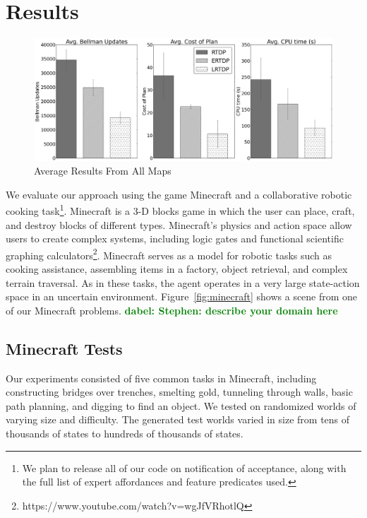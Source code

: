 \documentclass[letterpaper]{article}
\newcommand{\dnote}[1]{\textcolor{Green}{\textbf{dabel:  #1}}}
\begin{document}
\section{Results}
\label{sec:results}

\begin{figure}
\centering
\includegraphics[scale=0.18]{figures/average_results_cropped.png}%
\caption{Average Results From All Maps}
\label{fig:average_results}
\end{figure}

We evaluate our approach using the game Minecraft and a
collaborative robotic cooking task\footnote{We plan to release all of our code on notification of acceptance, along with the full list of expert affordances and feature predicates used.}.  Minecraft is a 3-D blocks game in which
the user can place, craft, and destroy blocks of different types.
Minecraft's physics and action space allow users to create complex
systems, including logic gates and functional scientific graphing
calculators\footnote{https://www.youtube.com/watch?v=wgJfVRhotlQ}.
Minecraft serves as a model for robotic tasks such as cooking
assistance, assembling items in a factory, object retrieval, and
complex terrain traversal.  As in these tasks, the agent operates in a
very large state-action space in an uncertain environment.
Figure~\ref{fig:minecraft} shows a scene from one of our Minecraft
problems. \dnote{Stephen: describe your domain here}

\subsection{Minecraft Tests}

Our experiments consisted of five common tasks in Minecraft, including
constructing bridges over trenches, smelting gold, tunneling
through walls, basic path planning, and digging to find an object.  We tested on 
randomized worlds of varying size and difficulty. The generated test
worlds varied in size from tens of thousands of states to hundreds of thousands of states.
\end{document}

